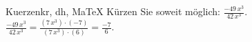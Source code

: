 \begin{MAufgabe}{Kuerzen}{kr, dh, MaTeX}
K\"urzen Sie soweit m\"oglich: $\frac{- 49\, x^3}{42\, x^3}$.\\ 
\ifLsg\MLoesung
\quad $\frac{- 49\, x^3}{42\, x^3}=\frac{(7\, x^3)\cdot(-7)}{(7\, x^3)\cdot(6)}=\frac{-7}{6}$.\else\relax\fi
 \end{MAufgabe}